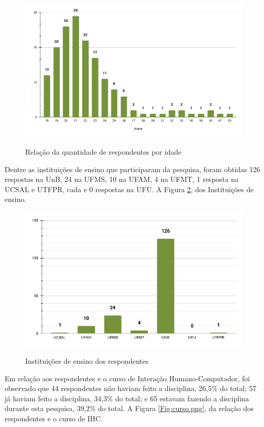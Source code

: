 \begin{apendicesenv}
\newpage
\begin{figure}[htbp]
	\centering
	\caption{Relação da quantidade de respondentes por idade}
	\includegraphics[keepaspectratio=true,scale=0.51]{figuras/apendice/graficos_survey/idade.png}
	\label{Fig:idade.png}
\end{figure}

Dentre as instituições de ensino que participaram da pesquisa, foram obtidas 126 respostas na UnB, 24 na UFMS, 10 na UFAM, 4 na UFMT, 1 resposta na UCSAL e UTFPR, cada e 0 respostas na UFU. A Figura \ref{Fig:campus.png}, dos Instituições de ensino.

\begin{figure}[htbp]
	\centering
	\caption{Instituições de ensino dos respondentes}
	\includegraphics[keepaspectratio=true,scale=0.5]{figuras/apendice/graficos_survey/campus.png}
	\label{Fig:campus.png}
\end{figure}

\newpage
Em relação aos respondentes e o curso de Interação Humano-Computador, foi observado que 44 respondentes não haviam feito a disciplina, 26,5\% do total; 57 já haviam feito a disciplina, 34,3\% do total; e 65 estavam fazendo a disciplina durante esta pesquisa, 39,2\% do total. A Figura \ref{Fig:curso.png}, da relação dos respondentes e o curso de IHC.


\end{apendicesenv}
